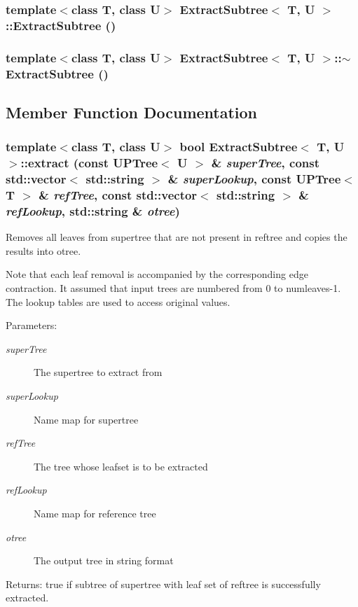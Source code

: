 \subsubsection{\setlength{\rightskip}{0pt plus 5cm}template$<$class T, class U$>$ {\bf Extract\-Subtree}$<$ T, U $>$::{\bf Extract\-Subtree} ()}\label{classExtractSubtree_a0}


\subsubsection{\setlength{\rightskip}{0pt plus 5cm}template$<$class T, class U$>$ {\bf Extract\-Subtree}$<$ T, U $>$::$\sim${\bf Extract\-Subtree} ()}\label{classExtractSubtree_a1}




\subsection{Member Function Documentation}
\subsubsection{\setlength{\rightskip}{0pt plus 5cm}template$<$class T, class U$>$ bool {\bf Extract\-Subtree}$<$ T, U $>$::extract (const {\bf UPTree}$<$ U $>$ \& {\em super\-Tree}, const std::vector$<$ std::string $>$ \& {\em super\-Lookup}, const {\bf UPTree}$<$ T $>$ \& {\em ref\-Tree}, const std::vector$<$ std::string $>$ \& {\em ref\-Lookup}, std::string \& {\em otree})}\label{classExtractSubtree_a2}


Removes all leaves from supertree that are not present in reftree and copies the results into otree. 

Note that each leaf removal is accompanied by the corresponding edge contraction. It assumed that input trees are numbered from 0 to numleaves-1. The lookup tables are used to access original values. \begin{Desc}
\item[Parameters:]
\begin{description}
\item[{\em super\-Tree}]The supertree to extract from \item[{\em super\-Lookup}]Name map for supertree \item[{\em ref\-Tree}]The tree whose leafset is to be extracted \item[{\em ref\-Lookup}]Name map for reference tree \item[{\em otree}]The output tree in string format \end{description}
\end{Desc}
\begin{Desc}
\item[Returns:]true if subtree of supertree with leaf set of reftree is successfully extracted. \end{Desc}


